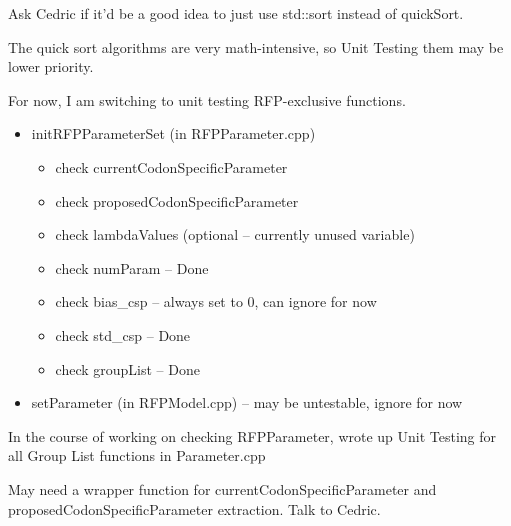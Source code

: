 \documentclass[12pt,hyperref]{labbook}
\newcommand{\sep}{\discretionary{}{}{}} %
\begin{document}
Ask Cedric if it'd be a good idea to just use std::sort instead of quickSort.

The quick sort algorithms are very math-intensive, so Unit Testing them may be lower priority.

For now, I am switching to unit testing RFP-exclusive functions.

\begin{itemize}
    \item initRFPParameterSet (in RFPParameter.cpp)
    \begin{itemize}
        \item check currentCodonSpecificParameter
        \item check proposedCodonSpecificParameter
        \item check lambdaValues (optional -- currently unused variable)
        \item check numParam -- Done
        \item check bias\_csp -- always set to 0, can ignore for now
        \item check std\_csp -- Done
        \item check groupList -- Done
    \end{itemize}
    \item setParameter (in RFPModel.cpp) -- may be untestable, ignore for now
\end{itemize}

In the course of working on checking RFPParameter, wrote up Unit Testing for all
Group List functions in Parameter.cpp

May need a wrapper function for current\sep Codon\sep Specific\sep Parameter and 
proposed\sep Codon\sep Specific\sep Parameter
extraction. Talk to Cedric.
\end{document}
